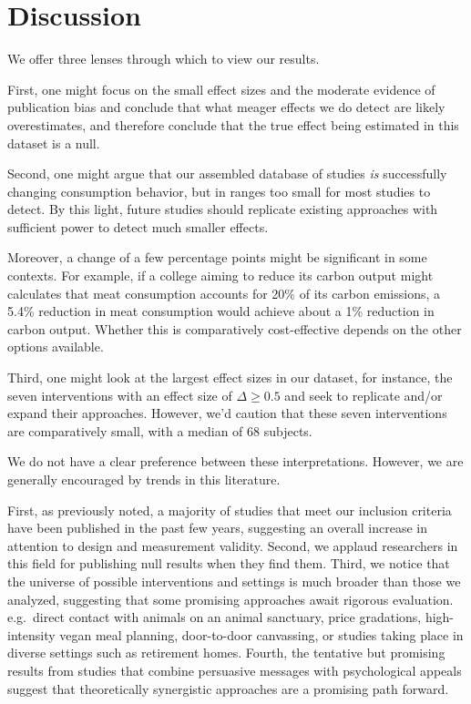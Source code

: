 \documentclass[sn-nature,pdflatex]{sn-jnl}
\begin{document}
\section{Discussion}\label{Sec4}

We offer three lenses through which to view our results.

First, one might focus on the small effect sizes and the moderate
evidence of publication bias and conclude that what meager effects we do
detect are likely overestimates, and therefore conclude that the true
effect being estimated in this dataset is a null.

Second, one might argue that our assembled database of studies \emph{is}
successfully changing consumption behavior, but in ranges too small for
most studies to detect. By this light, future studies should replicate
existing approaches with sufficient power to detect much smaller
effects.

Moreover, a change of a few percentage points might be significant in
some contexts. For example, if a college aiming to reduce its carbon
output might calculates that meat consumption accounts for 20\% of its
carbon emissions, a 5.4\% reduction in meat consumption
\citep{jalil2023} would achieve about a 1\% reduction in carbon output.
Whether this is comparatively cost-effective depends on the other
options available.

Third, one might look at the largest effect sizes in our dataset, for
instance, the seven interventions with an effect size of
\(\Delta \geq 0.5\)
\citep{bianchi2022, carfora2023, kanchanachitra2020, merrill2009, piester2020}
and seek to replicate and/or expand their approaches. However, we'd
caution that these seven interventions are comparatively small, with a
median of 68 subjects.

We do not have a clear preference between these interpretations.
However, we are generally encouraged by trends in this literature.

First, as previously noted, a majority of studies that meet our
inclusion criteria have been published in the past few years, suggesting
an overall increase in attention to design and measurement validity.
Second, we applaud researchers in this field for publishing null results
when they find them. Third, we notice that the universe of possible
interventions and settings is much broader than those we analyzed,
suggesting that some promising approaches await rigorous evaluation.
e.g.~direct contact with animals on an animal sanctuary, price
gradations, high-intensity vegan meal planning, door-to-door canvassing,
or studies taking place in diverse settings such as retirement homes.
Fourth, the tentative but promising results from studies that combine
persuasive messages with psychological appeals suggest that
theoretically synergistic approaches are a promising path forward.
\end{document}
